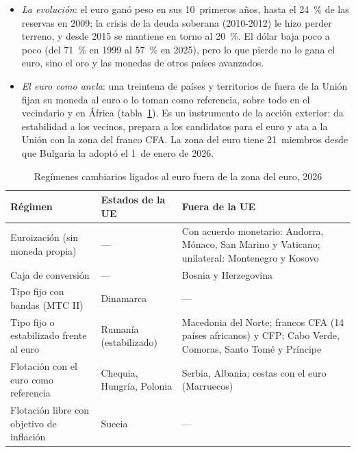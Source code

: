 \documentclass[11pt]{article}
\begin{document}
\begin{itemize}
\item \emph{La evolución}: el euro ganó peso en sus 10~primeros años, hasta el 24~\% de las reservas en 2009; la crisis de la deuda soberana (2010-2012) le hizo perder terreno, y desde 2015 se mantiene en torno al 20~\%. El dólar baja poco a poco (del 71~\% en 1999 al 57~\% en 2025), pero lo que pierde no lo gana el euro, sino el oro y las monedas de otros países avanzados\nocite{FMI2026COFER}.
\item \emph{El euro como ancla}: una treintena de países y territorios de fuera de la Unión fijan su moneda al euro o lo toman como referencia, sobre todo en el vecindario y en África (tabla~\ref{tab:anclas}). Es un instrumento de la acción exterior: da estabilidad a los vecinos, prepara a los candidatos para el euro y ata a la Unión con la zona del franco CFA\nocite{BCE2026PapelEuro}. La zona del euro tiene 21~miembros desde que Bulgaria la adoptó el 1~de enero de 2026.
\end{itemize}

\begin{table}[H]
\centering
\caption{Regímenes cambiarios ligados al euro fuera de la zona del euro, 2026}\label{tab:anclas}
\small
\begin{tabular}{>{\raggedright\arraybackslash}m{4.6cm}>{\raggedright\arraybackslash}m{3.4cm}>{\raggedright\arraybackslash}m{6.0cm}}
\toprule
\rowcolor{tceeazulpalido} Régimen & Estados de la UE & Fuera de la UE \\
\midrule
Euroización (sin moneda propia) & --- & Con acuerdo monetario: Andorra, Mónaco, San Marino y Vaticano; unilateral: Montenegro y Kosovo \\
Caja de conversión & --- & Bosnia y Herzegovina \\
Tipo fijo con bandas (MTC II) & Dinamarca & --- \\
Tipo fijo o estabilizado frente al euro & Rumanía (estabilizado) & Macedonia del Norte; francos CFA (14 países africanos) y CFP; Cabo Verde, Comoras, Santo Tomé y Príncipe \\
Flotación con el euro como referencia & Chequia, Hungría, Polonia & Serbia, Albania; cestas con el euro (Marruecos) \\
Flotación libre con objetivo de inflación & Suecia & --- \\
\bottomrule
\end{tabular}
\end{table}
\end{document}

